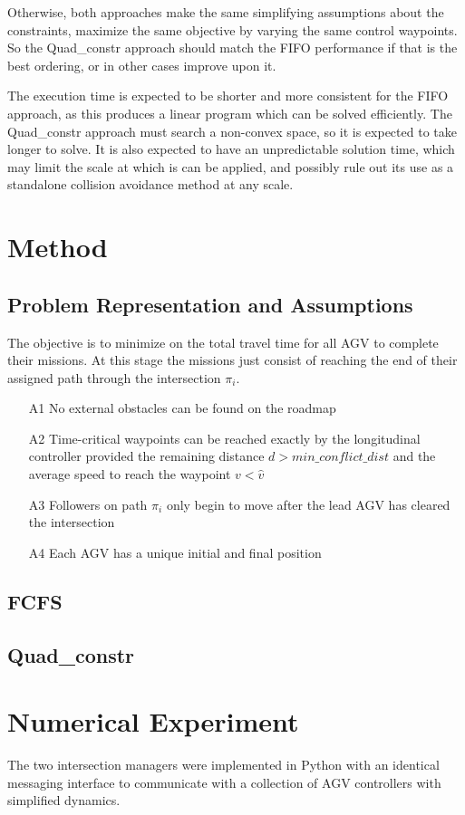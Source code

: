 \documentclass[11pt]{article} %
\begin{document}
Otherwise, both approaches make the same simplifying assumptions about the constraints, maximize the same objective by varying the same control waypoints. So the Quad\_constr approach should match the FIFO performance if that is the best ordering, or in other cases improve upon it.

The execution time is expected to be shorter and more consistent for the FIFO approach, as this produces a linear program which can be solved efficiently. The Quad\_constr approach must search a non-convex space, so it is expected to take longer to solve. It is also expected to have an unpredictable solution time, which may limit the scale at which is can be applied, and possibly rule out its use as a  standalone collision avoidance method at any scale.

\section{Method}
\subsection{Problem Representation and Assumptions}
The objective is to minimize on the total travel time for all AGV to complete their missions. At this stage the missions just consist of reaching the end of their assigned path through the intersection $\pi_i$. 
\begin{itemize}
\item[A1] No external obstacles can be found on the roadmap
\item[A2] Time-critical waypoints can be reached exactly by the longitudinal controller provided the remaining distance $d>min\_conflict\_dist$ and the average speed to reach the waypoint $v < \hat{v}$
\item[A3] Followers on path $\pi_i$ only begin to move after the lead AGV has cleared the intersection 
\item[A4] Each AGV has a unique initial and final position
\end{itemize}
\subsection{FCFS}
\subsection{Quad\_constr}
    

\section{Numerical Experiment}
The two intersection managers were implemented in Python with an identical messaging interface to communicate with a collection of AGV controllers with simplified dynamics. 
\end{document}
